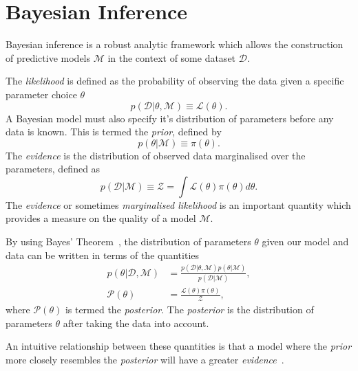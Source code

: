 \documentclass[11pt]{article}
\begin{document}
    \section{Bayesian Inference}\label{sec:bayesian_inference}
    Bayesian inference is a robust analytic framework which allows the construction of predictive models $\mathcal{M}$
    in the context of some dataset $\mathcal{D}$.

    The \emph{likelihood} is defined as the probability of observing the data given a specific parameter choice $\theta$
    \begin{equation}\label{eq:likelihood}
        p(\mathcal{D} | \theta, \mathcal{M}) \equiv \mathcal{L}(\theta).
    \end{equation}
    A Bayesian model must also specify it's distribution of parameters before any data is known.
    This is termed the \emph{prior}, defined by
    \begin{equation}\label{eq:prior}
        p(\theta|\mathcal{M}) \equiv \pi(\theta).
    \end{equation}
    The \emph{evidence} is the distribution of observed data marginalised over the parameters, defined as
    \begin{equation}\label{eq:evidence}
        p(\mathcal{D} | \mathcal{M}) \equiv \mathcal{Z} = \int{\mathcal{L}(\theta) \pi(\theta) d\theta}.
    \end{equation}
    The \emph{evidence} or sometimes \emph{marginalised likelihood} is an important quantity which provides a measure
    on the quality of a model $\mathcal{M}$.

    By using Bayes' Theorem~\cite{bishop2006}, the distribution of parameters $\theta$ given our model and data
    can be written in terms of the quantities
    \begin{equation}\label{eq:bayes_theorem}
    \begin{aligned}
        p(\theta | \mathcal{D}, \mathcal{M}) &=
            \frac{p(\mathcal{D} | \theta, \mathcal{M}) p(\theta|\mathcal{M})}{p(\mathcal{D} | \mathcal{M})}, \\
        \mathcal{P}(\theta) &= \frac{\mathcal{L}(\theta) \pi(\theta)}{\mathcal{Z}},
    \end{aligned}
    \end{equation}
    where $\mathcal{P}(\theta)$ is termed the \emph{posterior}.
    The \emph{posterior} is the distribution of parameters $\theta$ after taking the data into account.

    An intuitive relationship between these quantities is that a model where the \emph{prior} more closely
    resembles the \emph{posterior} will have a greater \emph{evidence}~\cite{mackay2003}.
\end{document}
